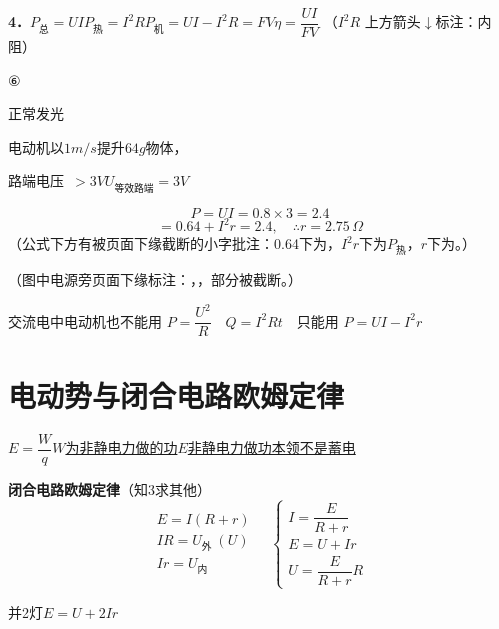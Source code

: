 \textbf{4．}\quad $P_{\text{总}}=UI$\quad $P_{\text{热}}=I^2R$\quad $P_{\text{机}}=UI-I^2R=FV$\quad $\eta=\dfrac{UI}{FV}$ %
（$I^2R$ 上方箭头$\downarrow$标注：内阻）

⑥

正常发光

电动机以$1\unit{m/s}$提升$64\unit{g}$物体，

路端电压\ $>3\unit{V}$\quad $U_{\text{等效路端}}=3\unit{V}$

\[ P=UI=0.8\times3=2.4 \]
\[ =0.64+I^{2}r=2.4,\quad \therefore r=2.75\,\Omega \]
（公式下方有被页面下缘截断的小字批注：0.64下为，$I^2r$下为$P_{\text{热}}$，$r$下为。）

（图中电源旁页面下缘标注：，，部分被截断。）

交流电中电动机也不能用 $P=\dfrac{U^2}{R}$　$Q=I^2Rt$　只能用 $P=UI-I^2r$ %


\section{电动势与闭合电路欧姆定律}
$E=\dfrac{W}{q}$\quad \underline{$W$为非静电力做的功}\quad \underline{$E$非静电力做功本领}\quad \underline{不是蓄电}

\textbf{闭合电路欧姆定律}（知3求其他）
\[
\begin{array}{l}
E=I(R+r)\\[8pt]
IR=U_{\text{外}}\ (U)\\[8pt]
Ir=U_{\text{内}}
\end{array}
\quad
\left\{\begin{array}{l}
I=\dfrac{E}{R+r}\\[8pt]
E=U+Ir\\[6pt]
U=\dfrac{E}{R+r}R
\end{array}\right.
\]

并2灯\quad $E=U+2Ir$

